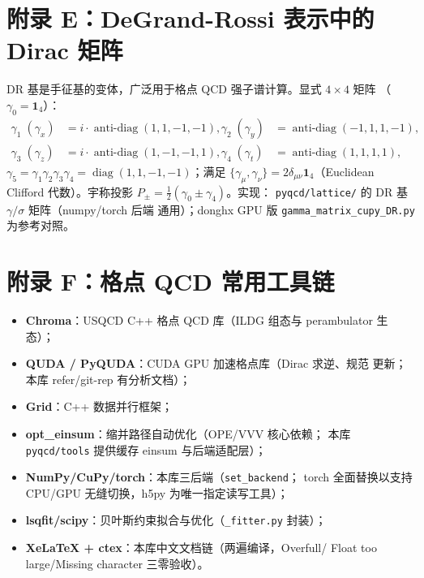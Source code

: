 \documentclass[11pt,a4paper]{ctexart}
\newcommand{\diag}{\operatorname{diag}}
\newcommand{\code}[1]{\texttt{#1}}
\begin{document}
\section{附录 E：DeGrand-Rossi 表示中的 Dirac 矩阵}
\label{sec:appendix-dr}

DR 基是手征基的变体，广泛用于格点 QCD 强子谱计算。显式 $4\times4$ 矩阵
（$\gamma_0=\mathbf1_4$）：
\begin{align}
\gamma_1\;(\gamma_x) &= i\cdot\operatorname{anti-diag}(1,1,-1,-1), &
\gamma_2\;(\gamma_y) &= \operatorname{anti-diag}(-1,1,1,-1), \\
\gamma_3\;(\gamma_z) &= i\cdot\operatorname{anti-diag}(1,-1,-1,1), &
\gamma_4\;(\gamma_t) &= \operatorname{anti-diag}(1,1,1,1),
\end{align}
$\gamma_5=\gamma_1\gamma_2\gamma_3\gamma_4=\diag(1,1,-1,-1)$；满足
$\{\gamma_\mu,\gamma_\nu\}=2\delta_{\mu\nu}\mathbf1_4$（Euclidean
Clifford 代数）。宇称投影 $P_\pm=\frac12(\gamma_0\pm\gamma_4)$。实现：
\code{pyqcd/lattice/} 的 DR 基 $\gamma/\sigma$ 矩阵（numpy/torch 后端
通用）；donghx GPU 版 \code{gamma\_matrix\_cupy\_DR.py} 为参考对照。

\section{附录 F：格点 QCD 常用工具链}

\begin{itemize}
  \item \textbf{Chroma}：USQCD C++ 格点 QCD 库（ILDG 组态与 perambulator
  生态）；
  \item \textbf{QUDA / PyQUDA}：CUDA GPU 加速格点库（Dirac 求逆、规范
  更新；本库 refer/git-rep 有分析文档）；
  \item \textbf{Grid}：C++ 数据并行框架；
  \item \textbf{opt\_einsum}：缩并路径自动优化（OPE/VVV 核心依赖；
  本库 \code{pyqcd/tools} 提供缓存 einsum 与后端适配层）；
  \item \textbf{NumPy/CuPy/torch}：本库三后端（\code{set\_backend}；
  torch 全面替换以支持 CPU/GPU 无缝切换，h5py 为唯一指定读写工具）；
  \item \textbf{lsqfit/scipy}：贝叶斯约束拟合与优化（\code{\_fitter.py}
  封装）；
  \item \textbf{XeLaTeX + ctex}：本库中文文档链（两遍编译，Overfull/
  Float too large/Missing character 三零验收）。
\end{itemize}
\end{document}
